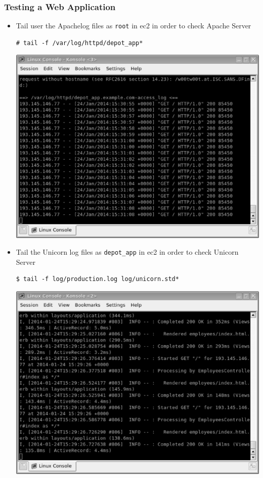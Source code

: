 \documentclass{beamer}
\begin{document}
\begin{frame}
\frametitle{Testing a Web Application}
\begin{itemize}
\item Tail user the Apachelog files  as \texttt{root}  in \acrshort{ec2} in order to check Apache Server
\lstset{language=shell}
\begin{lstlisting}[escapechar=!]
# tail -f /var/log/httpd/depot_app*
\end{lstlisting}
\includegraphics[scale=0.15]{logapache.eps}

\item Tail the Unicorn log files as \texttt{depot\_app} in \acrshort{ec2} in order to check Unicorn Server
\lstset{language=shell}
\begin{lstlisting}[escapechar=!]
$ tail -f log/production.log log/unicorn.std*
\end{lstlisting}
\includegraphics[scale=0.15]{lograils.eps}


\end{itemize}
\end{frame}
\end{document}
